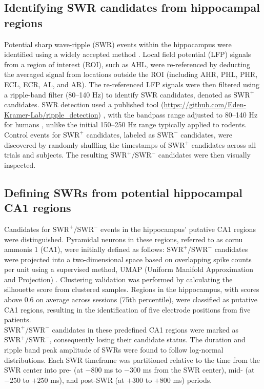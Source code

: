 \documentclass[final,3p,times,twocolumn]{elsarticle}
\begin{document}
\subsection{Identifying SWR candidates from hippocampal regions}
Potential sharp wave-ripple (SWR) events within the hippocampus were identified using a widely accepted method \cite{liu_consensus_2022}. Local field potential (LFP) signals from a region of interest (ROI), such as AHL, were re-referenced by deducting the averaged signal from locations outside the ROI (including AHR, PHL, PHR, ECL, ECR, AL, and AR). The re-referenced LFP signals were then filtered using a ripple-band filter (80--140 Hz) to identify SWR candidates, denoted as $\textrm{SWR}^+$ candidates. SWR detection used a published tool (\url{https://github.com/Eden-Kramer-Lab/ripple_detection}) \cite{kay_hippocampal_2016}, with the bandpass range adjusted to 80--140 Hz for humans \cite{norman_hippocampal_2019, norman_hippocampal_2021}, unlike the initial 150--250 Hz range typically applied to rodents.
\\
\indent
Control events for $\textrm{SWR}^+$ candidates, labeled as $\textrm{SWR}^-$ candidates, were discovered by randomly shuffling the timestamps of $\textrm{SWR}^+$ candidates across all trials and subjects. The resulting $\textrm{SWR}^+/\textrm{SWR}^-$ candidates were then visually inspected.

\subsection{Defining SWRs from potential hippocampal CA1 regions}
Candidates for $\textrm{SWR}^+/\textrm{SWR}^-$ events in the hippocampus' putative CA1 regions were distinguished. Pyramidal neurons in these regions, referred to as cornu ammonis 1 (CA1), were initially defined as follows: $\textrm{SWR}^+/\textrm{SWR}^-$ candidates were projected into a two-dimensional space based on overlapping spike counts per unit using a supervised method, UMAP (Uniform Manifold Approximation and Projection) \cite{mcinnes_umap_2018}. Clustering validation was performed by calculating the silhouette score \cite{rousseeuw_silhouettes_1987} from clustered samples. Regions in the hippocampus, with scores above 0.6 on average across sessions (75th percentile), were classified as putative CA1 regions, resulting in the identification of five electrode positions from five patients.
\\
\indent
$\textrm{SWR}^+/\textrm{SWR}^-$ candidates in these predefined CA1 regions were marked as $\textrm{SWR}^+/\textrm{SWR}^-$, consequently losing their candidate status. The duration and ripple band peak amplitude of SWRs were found to follow log-normal distributions. Each SWR timeframe was partitioned relative to the time from the SWR center into pre- (at $-800$ ms to $-300$ ms from the SWR center), mid- (at $-250$ to $+250$ ms), and post-SWR (at $+300$ to $+800$ ms) periods.
\end{document}
